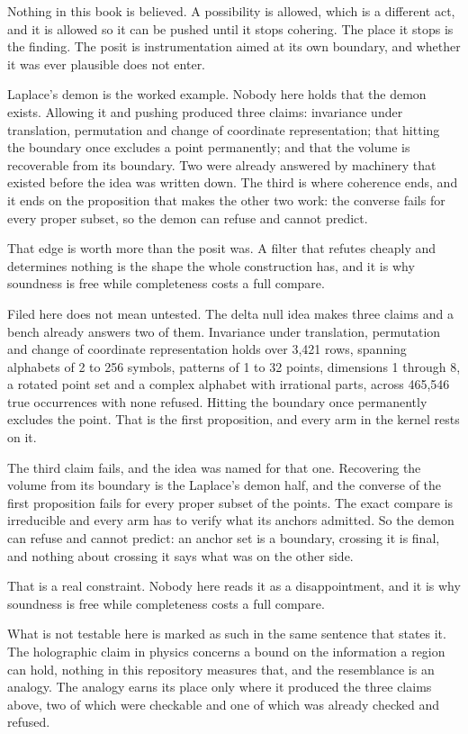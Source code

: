 Nothing in this book is believed. A possibility is allowed, which is a different act, and it is
allowed so it can be pushed until it stops cohering. The place it stops is the finding. The posit
is instrumentation aimed at its own boundary, and whether it was ever plausible does not enter.

Laplace's demon is the worked example. Nobody here holds that the demon exists. Allowing it and
pushing produced three claims: invariance under translation, permutation and change of coordinate
representation; that hitting the boundary once excludes a point permanently; and that the volume is
recoverable from its boundary. Two were already answered by machinery that existed before the idea
was written down. The third is where coherence ends, and it ends on the proposition that makes the
other two work: the converse fails for every proper subset, so the demon can refuse and cannot
predict.

That edge is worth more than the posit was. A filter that refutes cheaply and determines nothing is
the shape the whole construction has, and it is why soundness is free while completeness costs a
full compare.

Filed here does not mean untested. The delta null idea makes three claims and a bench already
answers two of them. Invariance under translation, permutation and change of coordinate
representation holds over 3,421 rows, spanning alphabets of 2 to 256 symbols, patterns of 1 to 32
points, dimensions 1 through 8, a rotated point set and a complex alphabet with irrational parts,
across 465,546 true occurrences with none refused. Hitting the boundary once permanently excludes the
point. That is the first proposition, and every arm in the kernel rests on it.

The third claim fails, and the idea was named for that one. Recovering the volume from its
boundary is the Laplace's demon half, and the converse of the first proposition fails for every
proper subset of the points. The exact compare is irreducible and every arm has to verify what its
anchors admitted. So the demon can refuse and cannot predict: an anchor set is a boundary, crossing
it is final, and nothing about crossing it says what was on the other side.

That is a real constraint. Nobody here reads it as a disappointment, and it is why soundness is
free while completeness costs a full compare.

What is not testable here is marked as such in the same sentence that states it. The holographic
claim in physics concerns a bound on the information a region can hold, nothing in this repository
measures that, and the resemblance is an analogy. The analogy earns its place only where it produced
the three claims above, two of which were checkable and one of which was already checked and refused.
\cleardoublepage
